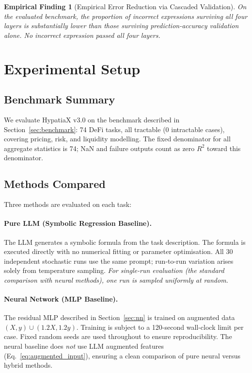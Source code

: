 \documentclass[twoside,11pt]{article}
\newcommand{\Rsq}{R^{2}}
\newtheorem{finding}{Empirical Finding}
\begin{document}
\begin{finding}[Empirical Error Reduction via Cascaded Validation]
\label{prop:validation_reduction}
On the evaluated benchmark, the proportion of incorrect expressions surviving
all four layers is substantially lower than those surviving prediction-accuracy
validation alone.  No incorrect expression passed all four layers.
\end{finding}

\section{Experimental Setup}
\label{sec:setup}

\subsection{Benchmark Summary}\label{subsec:benchmark-summary}
\label{sec:setup_summary}

We evaluate HypatiaX v3.0 on the benchmark described in Section~\ref{sec:benchmark}:
74 DeFi tasks, all tractable (0 intractable cases), covering pricing, risk, and
liquidity modelling.  The fixed denominator for all aggregate statistics is 74;
NaN and failure outputs count as zero $\Rsq$ toward this denominator.

\subsection{Methods Compared}\label{subsec:methods-compared}
\label{sec:setup_methods}

Three methods are evaluated on each task:

\paragraph{Pure LLM (Symbolic Regression Baseline).}
The LLM generates a symbolic formula from the task description.  The formula is
executed directly with no numerical fitting or parameter optimisation.  All 30
independent stochastic runs use the same prompt; run-to-run variation arises
solely from temperature sampling.  \emph{For single-run evaluation (the standard
comparison with neural methods), one run is sampled uniformly at random.}

\paragraph{Neural Network (MLP Baseline).}
The residual MLP described in Section~\ref{sec:nn} is trained on augmented data
$(X, y) \cup (1.2X, 1.2y)$.  Training is subject to a 120-second wall-clock
limit per case.  Fixed random seeds are used throughout to ensure reproducibility.
The neural baseline does \emph{not} use LLM augmented features (Eq.~\ref{eq:augmented_input}),
ensuring a clean comparison of pure neural versus hybrid methods.
\end{document}

